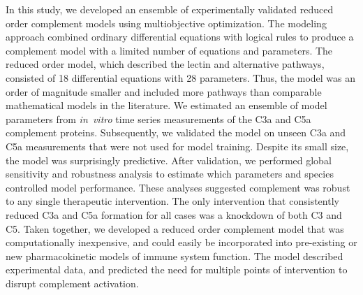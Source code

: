 \documentclass[12pt]{article}
\begin{document}
In this study, we developed an ensemble of experimentally validated reduced order complement models using multiobjective optimization.
The modeling approach combined ordinary differential equations with logical rules to produce a complement model with a limited number of equations and parameters.
The reduced order model,  which described the lectin and alternative pathways, consisted of 18 differential equations with 28 parameters.
Thus, the model was an order of magnitude smaller and included more pathways than comparable mathematical models in the literature.
We estimated an ensemble of model parameters from \textit{in~vitro} time series measurements of the C3a and C5a complement proteins.
Subsequently, we validated the model on unseen C3a and C5a measurements that were not used for model training.
Despite its small size, the model was surprisingly predictive.
After validation, we performed global sensitivity and robustness analysis to estimate which parameters and species
controlled model performance. These analyses suggested complement was robust to any single therapeutic intervention.
The only intervention that consistently reduced C3a and C5a formation for all cases was a knockdown of both C3 and C5.
Taken together, we developed a reduced order complement model that was computationally inexpensive,
and could easily be incorporated into pre-existing or new pharmacokinetic models of immune system function.
The model described experimental data, and predicted the need for multiple points of intervention to disrupt complement activation.
\end{document}
